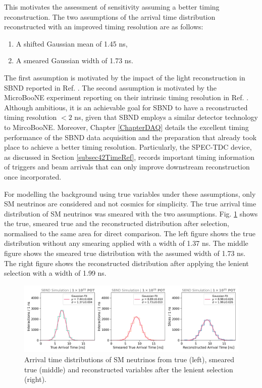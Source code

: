 This motivates the assessment of sensitivity assuming a better timing reconstruction.
The two assumptions of the arrival time distribution reconstructed with an improved timing resolution are as follows:
\begin{enumerate}
    \item A shifted Gaussian mean of 1.45 ns,
    \item A smeared Gaussian width of 1.73 ns.
\end{enumerate}
The first assumption is motivated by the impact of the light reconstruction in SBND reported in Ref. \cite{sbnd_pds_paper}.
The second assumption is motivated by the MicroBooNE experiment reporting on their intrinsic timing resolution in Ref. \cite{uboone_ns}.
Although ambitious, it is an achievable goal for SBND to have a reconstructed timing resolution $< 2$ ns, given that SBND employs a similar detector technology to MircoBooNE.
Moreover, Chapter \ref{ChapterDAQ} details the excellent timing performance of the SBND data acquisition and the preparation that already took place to achieve a better timing resolution.
Particularly, the SPEC-TDC device, as discussed in Section \ref{subsec42TimeRef}, records important timing information of triggers and beam arrivals that can only improve downstream reconstruction once incorporated. 

For modelling the background using true variables under these assumptions, only SM neutrinos are considered and not cosmics for simplicity. 
The true arrival time distribution of SM neutrinos was smeared with the two assumptions.
Fig. \ref{fig:gaus_truth_smear} shows the true, smeared true and the reconstructed distribution after selection, normalised to the same area for direct comparison.
The left figure shows the true distribution without any smearing applied with a width of 1.37 ns.
The middle figure shows the smeared true distribution with the assumed width of 1.73 ns.
The right figure shows the reconstructed distribution after applying the lenient selection with a width of 1.99 ns.

\begin{figure}[ht!]
    \centering
    \includegraphics[width=\textwidth]{truth_smear_reco_gaus.png}
    \caption[Arrival Time of SM Neutrinos with an Improved Timing Resolution]{Arrival time distributions of SM neutrinos from true (left), smeared true (middle) and reconstructed variables after the lenient selection (right).}
    \label{fig:gaus_truth_smear}
\end{figure}


